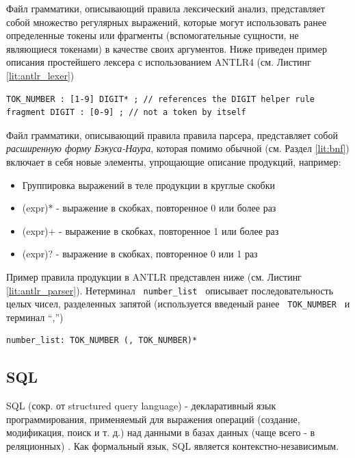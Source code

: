 Файл грамматики, описывающий правила лексический анализ, представляет собой множество регулярных выражений, которые могут использовать ранее определенные токены или фрагменты (вспомогательные сущности, не являющиеся токенами) в качестве своих аргументов. Ниже приведен пример описания простейшего лексера с использованием ANTLR4 (см. Листинг \ref{lit:antlr_lexer})

\begin{code}
\label{lit:antlr_lexer}
\begin{verbatim}
TOK_NUMBER : [1-9] DIGIT* ; // references the DIGIT helper rule
fragment DIGIT : [0-9] ; // not a token by itself
\end{verbatim}
\end{code}

Файл грамматики, описывающий правила правила парсера, представляет собой \textit{расширенную форму Бэкуса-Наура}, которая помимо обычной (см. Раздел \ref{lit:bnf}) включает в себя новые элементы, упрощающие описание продукций, например:

\begin{itemize}
    \item Группировка выражений в теле продукции в круглые скобки
    \item (expr)* - выражение в скобках, повторенное 0 или более раз
    \item (expr)+ - выражение в скобках, повторенное 1 или более раз
    \item (expr)? - выражение в скобках, повторенное 0 или 1 раз
\end{itemize}

Пример правила продукции в ANTLR представлен ниже (см. Листинг \ref{lit:antlr_parser}). Нетерминал \texttt{ number_list } описывает последовательность целых чисел, разделенных запятой (используется введеный ранее \texttt{ TOK_NUMBER } и терминал \enquote{,})

\begin{code}
\label{lit:antlr_parser}
\begin{verbatim}
number_list: TOK_NUMBER (, TOK_NUMBER)*
\end{verbatim}
\end{code}

\subsection{SQL} \label{lit:sql}
SQL (сокр. от structured query language) - декларативный язык программирования, применяемый для выражения операций (создание, модификация, поиск и т. д.) над данными в базах данных (чаще всего - в реляционных) \cite{sql_standard}. Как формальный язык, SQL является контекстно-независимым.

